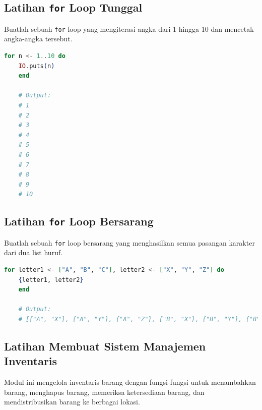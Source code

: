 \subsection{Latihan \texttt{for} Loop Tunggal}

Buatlah sebuah \texttt{for} loop yang mengiterasi angka dari 1 hingga 10 dan mencetak angka-angka tersebut.

\begin{lstlisting}[language=Elixir]
	for n <- 1..10 do
	IO.puts(n)
	end
	
	# Output:
	# 1
	# 2
	# 3
	# 4
	# 5
	# 6
	# 7
	# 8
	# 9
	# 10
\end{lstlisting}

\subsection{Latihan \texttt{for} Loop Bersarang}

Buatlah sebuah \texttt{for} loop bersarang yang menghasilkan semua pasangan karakter dari dua list huruf.


\begin{lstlisting}[language=Elixir]
	for letter1 <- ["A", "B", "C"], letter2 <- ["X", "Y", "Z"] do
	{letter1, letter2}
	end
	
	# Output:
	# [{"A", "X"}, {"A", "Y"}, {"A", "Z"}, {"B", "X"}, {"B", "Y"}, {"B", "Z"}, {"C", "X"}, {"C", "Y"}, {"C", "Z"}]
\end{lstlisting}

\subsection{Latihan Membuat Sistem Manajemen Inventaris}

Modul ini mengelola inventaris barang dengan fungsi-fungsi untuk menambahkan barang, menghapus barang, memeriksa ketersediaan barang, dan mendistribusikan barang ke berbagai lokasi.

